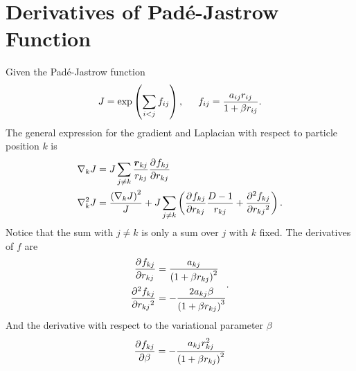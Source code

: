 \section{Derivatives of Pad\'e-Jastrow Function}
    Given the Pad\'e-Jastrow function
        \begin{equation}
            J = \exp\left(\sum\limits_{i<j}f_{ij}\right) ,\indent f_{ij} =
            \frac{a_{ij}r_{ij}}{1 + \beta r_{ij}}.
        \end{equation}
    The general expression for the gradient and Laplacian with respect to
    particle position $k$ is
        \begin{equation}
            \begin{aligned}
                \nabla_k J &= J\sum_{j\neq k} \frac{\blds{r}_{kj}}{r_{kj}}
                \prd{r_{kj}}[f_{kj}] \\
                \nabla^2_k J &= \frac{\left(\nabla_k J\right)^2}{J} +
                J\sum_{j\neq k} \left(\prd{r_{kj}}[f_{kj}] \frac{D-1}{r_{kj}} +
                \prd{r_{kj}}[f_{kj}][2]\right).
            \end{aligned}
        \end{equation}
    Notice that the sum with $j\neq k$ is only a sum over $j$ with $k$ fixed.
    The derivatives of $f$ are
        \begin{equation}
            \begin{aligned}
                \prd{r_{kj}}[f_{kj}] &= \frac{a_{kj}}{\left(1 + \beta
                r_{kj}\right)^2} \\
                \prd{r_{kj}}[f_{kj}][2] &= -\frac{2a_{kj}\beta}{\left(1 + \beta
                r_{kj}\right)^3}
            \end{aligned}.
        \end{equation}
    And the derivative with respect to the variational parameter $\beta$
        \begin{equation}
            \prd{\beta}[f_{kj}] = -\frac{a_{kj}r^2_{kj}}{\left(1 + \beta
            r_{kj}\right)^2}
        \end{equation}

